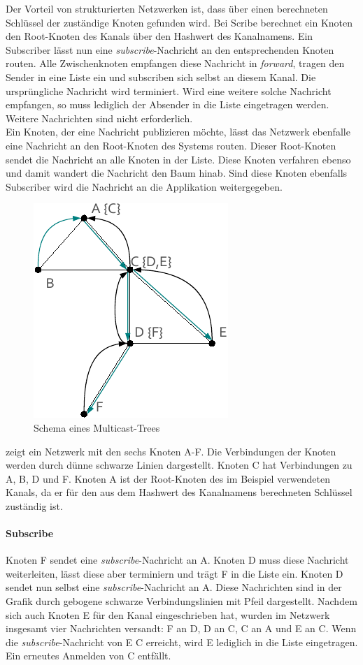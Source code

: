Der Vorteil von strukturierten Netzwerken ist, dass über einen berechneten Schlüssel der zuständige Knoten gefunden wird. Bei Scribe berechnet ein Knoten den Root-Knoten des Kanals über den Hashwert des Kanalnamens. Ein Subscriber lässt nun eine \emph{subscribe}-Nachricht an den entsprechenden Knoten routen. Alle Zwischenknoten empfangen diese Nachricht in \emph{forward}, tragen den Sender in eine Liste ein und subscriben sich selbst an diesem Kanal. Die ursprüngliche Nachricht wird terminiert. Wird eine weitere solche Nachricht empfangen, so muss lediglich der Absender in die Liste eingetragen werden. Weitere Nachrichten sind nicht erforderlich.\\
Ein Knoten, der eine Nachricht publizieren möchte, lässt das Netzwerk ebenfalle eine Nachricht an den Root-Knoten des Systems routen. Dieser Root-Knoten sendet die Nachricht an alle Knoten in der Liste. Diese Knoten verfahren ebenso und damit wandert die Nachricht den Baum hinab. Sind diese Knoten ebenfalls Subscriber wird die Nachricht an die Applikation weitergegeben.

\begin{figure}[htbp]
\centering
\includegraphics{grafics/multicast_tree.pdf}
\caption{Schema eines Multicast-Trees}
\label{fig:multicast_tree}
\end{figure}

 zeigt ein Netzwerk mit den sechs Knoten A-F. Die Verbindungen der Knoten werden durch dünne schwarze Linien dargestellt. Knoten C hat Verbindungen zu A, B, D und F. Knoten A ist der Root-Knoten des im Beispiel verwendeten Kanals, da er für den aus dem Hashwert des Kanalnamens berechneten Schlüssel zuständig ist.

\paragraph*{Subscribe} Knoten F sendet eine \emph{subscribe}-Nachricht an A. Knoten D muss diese Nachricht weiterleiten, lässt diese aber terminiern und trägt F in die Liste ein. Knoten D sendet nun selbst eine \emph{subscribe}-Nachricht an A. Diese Nachrichten sind in der Grafik durch gebogene schwarze Verbindungslinien mit Pfeil dargestellt. Nachdem sich auch Knoten E für den Kanal eingeschrieben hat, wurden im Netzwerk insgesamt vier Nachrichten versandt: F an D, D an C, C an A und E an C. Wenn die \emph{subscribe}-Nachricht von E C erreicht, wird E lediglich in die Liste eingetragen. Ein erneutes Anmelden von C entfällt.

